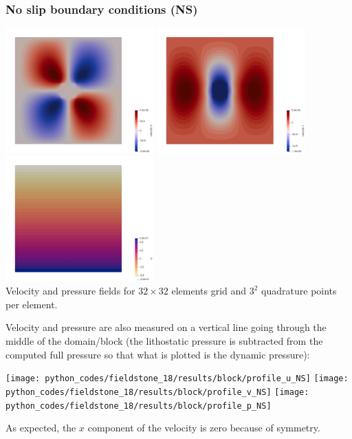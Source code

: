 \subsubsection*{No slip boundary conditions (NS)}

\begin{center}
\includegraphics[width=5.7cm]{python_codes/fieldstone_18/results/block/NS/u}
\includegraphics[width=5.7cm]{python_codes/fieldstone_18/results/block/NS/v}
\includegraphics[width=5.7cm]{python_codes/fieldstone_18/results/block/NS/p}\\
{\captionfont Velocity and pressure fields for $32\times 32$ elements grid and $3^2$
quadrature points per element.}
\end{center}

Velocity and pressure are also measured on a vertical line going through
the middle of the domain/block (the lithostatic pressure is 
subtracted from the computed full pressure so that what is plotted is the 
dynamic pressure):
\begin{center}
\texttt{[image: python\_codes/fieldstone\_18/results/block/profile\_u\_NS]}
\texttt{[image: python\_codes/fieldstone\_18/results/block/profile\_v\_NS]}
\texttt{[image: python\_codes/fieldstone\_18/results/block/profile\_p\_NS]}
\end{center}
As expected, the $x$ component of the velocity is zero because of symmetry.



